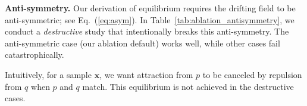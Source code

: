 \documentclass{article}
\newcommand{\vv}[1]{\mathbf{#1}}
\newcommand{\x}{\vv{x}}
\renewcommand{\paragraph}[1]{\vspace{.05em}\noindent\textbf{#1}}
\theoremstyle{plain}
\theoremstyle{definition}
\theoremstyle{remark}
\begin{document}
\paragraph{Anti-symmetry.}
Our derivation of equilibrium requires the drifting field to be anti-symmetric; see Eq.~(\ref{eq:asym}). In Table~\ref{tab:ablation_antisymmetry}, we conduct a \textit{destructive} study that intentionally breaks this anti-symmetry.
The anti-symmetric case (our ablation default) works well, while other cases fail catastrophically.

Intuitively, for a sample $\x$,
we want attraction from $p$ to be canceled by repulsion from $q$ when $p$ and $q$ match. This equilibrium is not achieved in the destructive cases.

\DeclareRobustCommand{\bgpos}[1]{%
  \begingroup
  \setlength{\fboxsep}{1pt}%
  \raisebox{0pt}[\height][0pt]{\colorbox{blue!15}{#1}}%
  \endgroup
}
\DeclareRobustCommand{\bgneg}[1]{%
  \begingroup
  \setlength{\fboxsep}{1pt}%
  \raisebox{0pt}[\height][0pt]{\colorbox{orange!15}{#1}}%
  \endgroup
}
\end{document}
